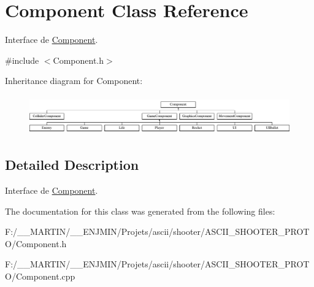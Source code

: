 \hypertarget{class_component}{}\section{Component Class Reference}
\label{class_component}


Interface de \hyperlink{class_component}{Component}.  




{\ttfamily \#include $<$Component.\+h$>$}

Inheritance diagram for Component\+:\begin{figure}[H]
\begin{center}
\leavevmode
\includegraphics[height=1.702128cm]{class_component}
\end{center}
\end{figure}


\subsection{Detailed Description}
Interface de \hyperlink{class_component}{Component}. 

The documentation for this class was generated from the following files\+:\begin{DoxyCompactItemize}
\item 
F\+:/\+\_\+\+\_\+\+M\+A\+R\+T\+I\+N/\+\_\+\+\_\+\+E\+N\+J\+M\+I\+N/\+Projets/ascii/shooter/\+A\+S\+C\+I\+I\+\_\+\+S\+H\+O\+O\+T\+E\+R\+\_\+\+P\+R\+O\+T\+O/Component.\+h\item 
F\+:/\+\_\+\+\_\+\+M\+A\+R\+T\+I\+N/\+\_\+\+\_\+\+E\+N\+J\+M\+I\+N/\+Projets/ascii/shooter/\+A\+S\+C\+I\+I\+\_\+\+S\+H\+O\+O\+T\+E\+R\+\_\+\+P\+R\+O\+T\+O/Component.\+cpp\end{DoxyCompactItemize}
